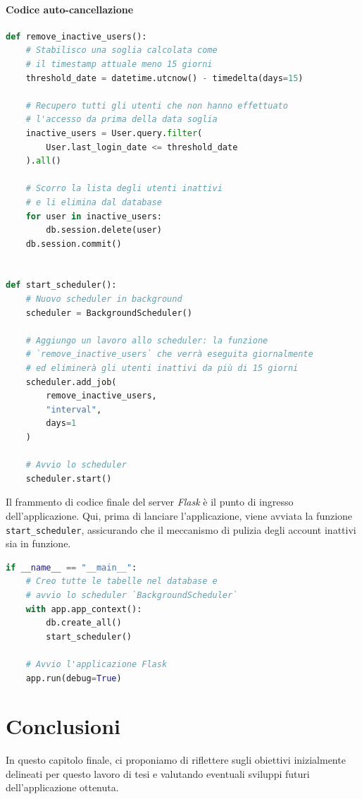 \documentclass[12pt]{report}
\newcommand{\flask}{\textsl{Flask}\xspace}
\begin{document}
\subsubsection{Codice auto-cancellazione}
\begin{lstlisting}[language=Python]
def remove_inactive_users():
    # Stabilisco una soglia calcolata come
    # il timestamp attuale meno 15 giorni
    threshold_date = datetime.utcnow() - timedelta(days=15)

    # Recupero tutti gli utenti che non hanno effettuato
    # l'accesso da prima della data soglia
    inactive_users = User.query.filter(
        User.last_login_date <= threshold_date
    ).all()

    # Scorro la lista degli utenti inattivi
    # e li elimina dal database
    for user in inactive_users:
        db.session.delete(user)
    db.session.commit()


def start_scheduler():
    # Nuovo scheduler in background
    scheduler = BackgroundScheduler()

    # Aggiungo un lavoro allo scheduler: la funzione
    # `remove_inactive_users` che verrà eseguita giornalmente
    # ed eliminerà gli utenti inattivi da più di 15 giorni
    scheduler.add_job(
        remove_inactive_users,
        "interval",
        days=1
    )

    # Avvio lo scheduler
    scheduler.start()
\end{lstlisting}


\newpage
\begin{mdframed}
\small
Il frammento di codice finale del server \flask è il punto di ingresso dell'applicazione. Qui, prima di lanciare l'applicazione, viene avviata la funzione \texttt{start\_scheduler}, assicurando che il meccanismo di pulizia degli account inattivi sia in funzione.

\begin{lstlisting}[language=Python]
if __name__ == "__main__":
    # Creo tutte le tabelle nel database e
    # avvio lo scheduler `BackgroundScheduler`
    with app.app_context():
        db.create_all()
        start_scheduler()

    # Avvio l'applicazione Flask
    app.run(debug=True)
\end{lstlisting}
\end{mdframed}




\chapter{Conclusioni}
\label{ch:conclusioni}
In questo capitolo finale, ci proponiamo di riflettere sugli obiettivi inizialmente delineati per questo lavoro di tesi e valutando eventuali sviluppi futuri dell'applicazione ottenuta.
\end{document}

